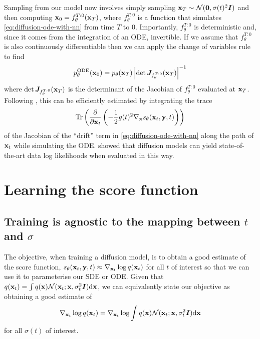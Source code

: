 Sampling from our model now involves simply sampling ${\mathbf{x}}_T \sim {\mathcal{N}}({\bm{0}}, \sigma(t)^2{\bm{I}})$ and then computing ${\mathbf{x}}_0 = f^{T:0}_\theta({\mathbf{x}}_T)$, where $f^{T:0}_\theta$ is a function that simulates \cref{eq:diffusion-ode-with-nn} from time $T$ to $0$. Importantly, $f^{T:0}_\theta$ is deterministic and, since it comes from the integration of an ODE, invertible. If we assume that $f^{T:0}_\theta$ is also continuously differentiable then we can apply the change of variables rule to find
\begin{equation}
    p_\theta^\text{ODE}({\mathbf{x}}_0) = p_\theta({\mathbf{x}}_T) \left| \det {\bm{J}}_{f^{T:0}_\theta}({\mathbf{x}}_T) \right|^{-1}
\end{equation}
where $\det {\bm{J}}_{f^{T:0}_\theta}({\mathbf{x}}_T)$ is the determinant of the Jacobian of $f^{T:0}_\theta$ evaluated at ${\mathbf{x}}_T$. Following \citet{chen2018neural}, this can be efficiently estimated by integrating the trace
\begin{equation}
    \text{Tr}\left( \frac{\partial}{\partial {\mathbf{x}}_t} \left( - \frac{1}{2} g(t)^2 \nabla_{\mathbf{x}} s_\theta({\mathbf{x}}_t, {\mathbf{y}}, t) \right)
    \right)
\end{equation}
of the Jacobian of the ``drift'' term in \cref{eq:diffusion-ode-with-nn} along the path of ${\mathbf{x}}_t$ while simulating the ODE. \citet{song2020score} showed that diffusion models can yield state-of-the-art data log likelihoods when evaluated in this way.




\section{Learning the score function} \label{sec:diffusion-training}

\subsection{Training is agnostic to the mapping between $t$ and $\sigma$}
The objective, when training a diffusion model, is to obtain a good estimate of the score function, $s_\theta({\mathbf{x}}_t, {\mathbf{y}}, t) \approx \nabla_{{\mathbf{x}}_t} \log q({\mathbf{x}}_t)$ for all $t$ of interest so that we can use it to parameterise our SDE or ODE. Given that $q({\mathbf{x}}_t) = \int q({\mathbf{x}}) {\mathcal{N}}({\mathbf{x}}_t; {\mathbf{x}}, \sigma_t^2{\bm{I}}) \mathrm{d}{\mathbf{x}}$, we can equivalently state our objective as obtaining a good estimate of 
\begin{equation}
\nabla_{{\mathbf{x}}_t} \log q({\mathbf{x}}_t) = \nabla_{{\mathbf{x}}_t} \log \int q({\mathbf{x}}) {\mathcal{N}}({\mathbf{x}}_t; {\mathbf{x}}, \sigma_t^2{\bm{I}}) \mathrm{d}{\mathbf{x}}
\end{equation}
for all $\sigma(t)$ of interest.


